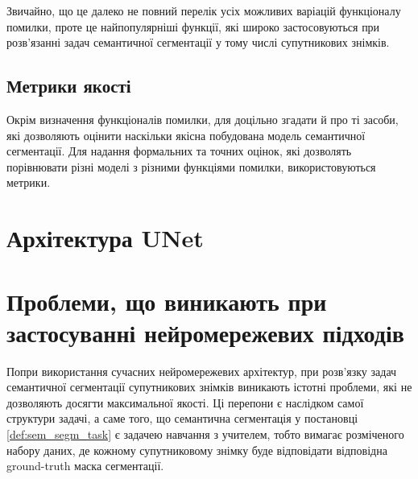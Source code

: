 Звичайно, що це далеко не повний перелік усіх можливих варіацій
функціоналу помилки, проте це найпопулярніші функції, які
широко застосовуються при розв'язанні задач семантичної
сегментації у тому числі супутникових знімків.

\subsection{Метрики якості}

Окрім визначення функціоналів помилки, для доцільно згадати й
про ті засоби, які дозволяють оцінити наскільки якісна побудована
модель семантичної сегментації.
Для надання формальних та точних оцінок, які дозволять порівнювати різні моделі
з різними функціями помилки, використовуються метрики.


\begin{definition}[IoU]\label{def:iou}

\end{definition}


\begin{definition}[Accuracy] \label{def:accuracy}

\end{definition}

\begin{definition} \label{def:user_accuracy}

\end{definition}

\begin{definition} \label{def:prod_accuracy}

\end{definition}

\section{Архітектура UNet}


\section{Проблеми, що виникають при застосуванні нейромережевих підходів}

Попри використання сучасних нейромережевих
архітектур, при розв'язку задач
семантичної сегментації супутникових знімків
виникають істотні проблеми, які не дозволяють
досягти максимальної якості. Ці перепони
є наслідком самої структури задачі, а саме того, що
семантична сегментація у постановці \ref{def:sem_segm_task}
є задачею навчання з учителем, тобто вимагає розміченого
набору даних, де кожному супутниковому знімку буде
відповідати відповідна ground-truth маска сегментації.

